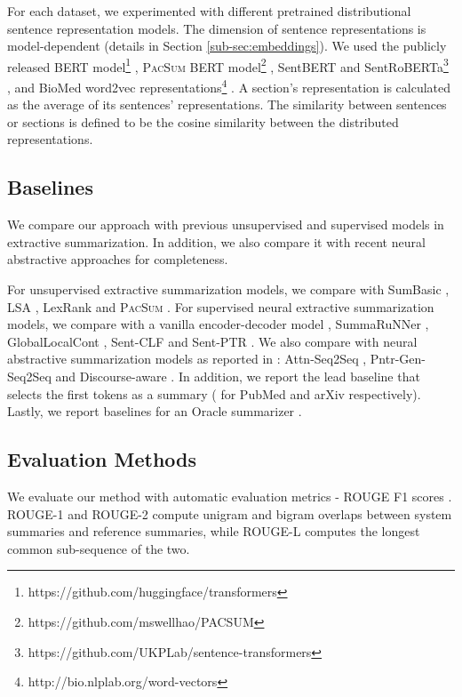 \documentclass[11pt,a4paper]{article}
\begin{document}
For each dataset, we experimented with different pretrained distributional sentence representation models. The dimension of sentence representations is model-dependent (details in Section \ref{sub-sec:embeddings}).  We used the publicly released BERT model\footnote{https://github.com/huggingface/transformers} \citep{devlin2019bert}, \textsc{PacSum} BERT model\footnote{https://github.com/mswellhao/PACSUM} \citep{zheng2019sentence}, SentBERT and SentRoBERTa\footnote{https://github.com/UKPLab/sentence-transformers} \citep{reimerssentence}, and BioMed word2vec representations\footnote{http://bio.nlplab.org/word-vectors} \citep{moen2013distributional}. A section's representation is calculated as the average of its sentences' representations. The similarity between sentences or sections is defined to be the cosine similarity between the distributed representations. 

\subsection{Baselines}\label{sub-sec:baseline_models}
We compare our approach with previous unsupervised and supervised models in extractive summarization. In addition, we also compare it with recent neural abstractive approaches for completeness. 

For unsupervised extractive summarization models, we compare with SumBasic \citep{vanderwende2007beyond},  LSA \citep{steinberger2004using}, LexRank \citep{erkan2004lexrank} and \textsc{PacSum} \citep{zheng2019sentence}. For supervised neural extractive summarization models, we compare with a vanilla encoder-decoder model \citep{cheng-lapata-2016-neural}, SummaRuNNer \citep{nallapati2017summarunner}, GlobalLocalCont \citep{xiao2019extractive}, Sent-CLF and Sent-PTR \citep{subramanian2019extractive}. We also compare with neural abstractive summarization models as reported in \citet{xiao2019extractive}: Attn-Seq2Seq \citep{nallapati2016abstractive}, Pntr-Gen-Seq2Seq \citep{see2017get} and Discourse-aware \citep{cohan2018discourse}. In addition, we report the lead baseline that selects the first  tokens as a summary ( for PubMed and arXiv respectively). Lastly, we report baselines for an Oracle summarizer \citep{nallapati2017summarunner}. 

\subsection{Evaluation Methods}\label{sub-sec:evalution_method}
We evaluate our method with automatic evaluation metrics - ROUGE F1 scores \citep{lin-2004-rouge}. ROUGE-1 and ROUGE-2 compute unigram and bigram overlaps between system summaries and reference summaries, while ROUGE-L computes the longest common sub-sequence of the two. 
\end{document}
